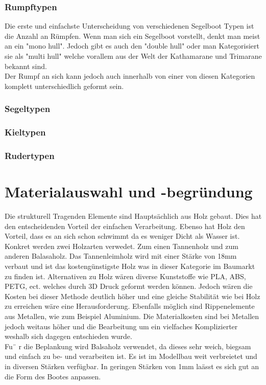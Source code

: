 \subsubsection{Rumpftypen}
Die erste und einfachste Unterscheidung von verschiedenen Segelboot Typen ist die Anzahl an Rümpfen. Wenn man sich ein Segelboot vorstellt, denkt man meist an ein "mono hull". Jedoch gibt es auch den "double hull" oder man Kategorisiert sie als "multi hull" welche vorallem aus der Welt der Kathamarane und Trimarane bekannt sind.\\
Der Rumpf an sich kann jedoch auch innerhalb von einer von diesen Kategorien komplett unterschiedlich geformt sein. 
%
\subsubsection{Segeltypen}

\subsubsection{Kieltypen}

\subsubsection{Rudertypen}


\section{Materialauswahl und -begründung }

Die strukturell Tragenden Elemente sind Hauptsächlich aus Holz gebaut. Dies hat den entscheidenden Vorteil der einfachen Verarbeitung. Ebenso hat Holz den Vorteil, dass es an sich schon schwimmt da es weniger Dicht als Wasser ist. Konkret werden zwei Holzarten verwedet. Zum einen Tannenholz und zum anderen Balasaholz. Das Tannenleimholz wird mit einer Stärke von 18mm verbaut und ist das kostengünstigste Holz was in dieser Kategorie im Baumarkt zu finden ist.
Alternativen zu Holz wären diverse Kunststoffe wie PLA, ABS, PETG, ect. welches durch 3D Druck geformt werden können. Jedoch wären die Kosten bei dieser Methode deutlich höher und eine gleiche Stabilität wie bei Holz zu erreichen wäre eine Herausforderung.
Ebenfalls möglich sind Rippenelemente aus Metallen, wie zum Beispiel Aluminium. Die Materialkosten sind bei Metallen jedoch weitaus höher und die Bearbeitung um ein vielfaches Komplizierter weshalb sich dagegen entschieden wurde.
\\
Fu¨ r die Beplankung wird Balsaholz verwendet, da dieses sehr weich, biegsam und einfach zu be- und verarbeiten ist. Es ist im Modellbau weit verbreietet und in diversen Stärken verfügbar. In geringen Stärken von 1mm laässt es sich gut an die Form des Bootes anpassen.

